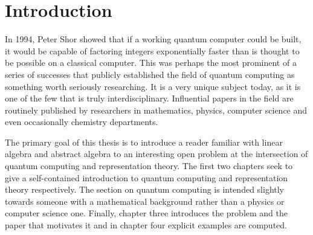 \chapter*{Introduction}


In 1994, Peter Shor showed that if a working quantum computer could be built, it would be capable of factoring 
integers exponentially faster than is thought to be possible on a classical computer. This was perhaps the most 
prominent of a series of successes that publicly established the field of quantum computing as something worth 
seriously researching. It is a very unique subject today, as it is one of the few that is truly interdisciplinary.  
Influential papers in the field are routinely published by researchers in mathematics, physics, computer science 
and even occasionally chemistry departments. 

The primary goal of this thesis is to introduce a reader familiar with linear algebra and abstract algebra to an 
interesting open problem at the intersection of quantum computing and  representation theory. The first two 
chapters seek to give a self-contained introduction to quantum computing  and representation theory respectively.  
The section on quantum computing is intended slightly towards someone with a mathematical background rather than a 
physics or computer science one. Finally, chapter three introduces the problem and the paper that motivates it and 
in chapter four explicit examples are computed.
    

